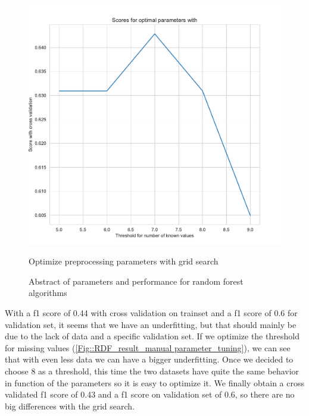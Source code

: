 \documentclass[11pt]{article}
\begin{document}
\begin{figure}
\begin{minipage}[t]{0.3\textwidth}
\includegraphics[width=1\linewidth]{bridges/threshold_grid_rdf1.pdf}
\caption{Optimize preprocessing parameters with grid search}
\label{Fig:: RF_treshhold_grid}
\end{minipage}
\begin{minipage}[t]{0.7\textwidth}
\centering
{}
    \caption{Abstract of parameters and performance for random forest algorithms}
    \label{tab_voting1}
\end{minipage}
\end{figure}

With a f1 score of 0.44 with cross validation on trainset and a f1 score of 0.6 for validation set, it seems that we have an underfitting, but that should mainly be due to the lack of data and a specific validation set.
If we optimize the threshold for missing values (\ref{Fig::RDF_result_manual parameter_tuning}), we can see that with even less data we can have a bigger underfitting. Once we decided to choose 8 as a threshold, this time the two datasets have quite the same behavior in function of the parameters so it is easy to optimize it.
We finally obtain a cross validated f1 score of 0.43 and a f1 score on validation set of 0.6, so there are no big differences with the grid search.
\end{document}

